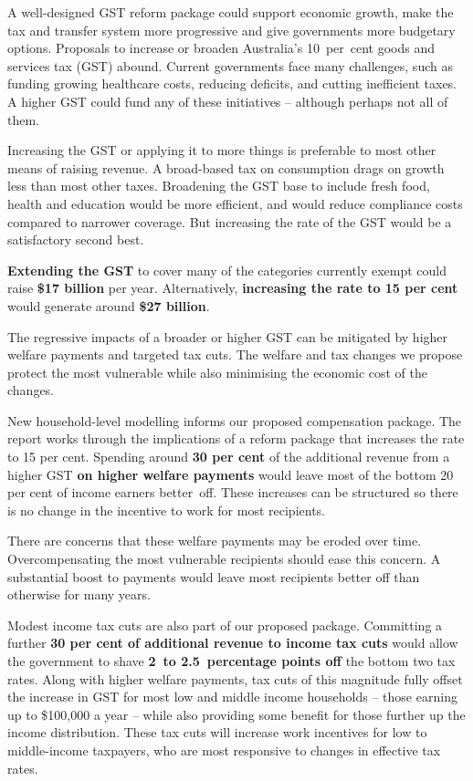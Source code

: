 

\setlength{\overviewextra}{2pt}
\addtolength{\columnsep}{\overviewextra}
\begin{overview}[-20pt]
A well-designed GST reform package could support economic growth, make the tax and transfer system more progressive and give governments more budgetary options.
Proposals to increase or broaden Australia’s 10~per~cent goods and services tax (GST) abound. Current governments face many challenges, such as funding growing healthcare costs, reducing deficits, and cutting inefficient taxes. A higher GST could fund any of these initiatives – although perhaps not all of them. 

Increasing the GST or applying it to more things is preferable to most other means of raising revenue. A broad-based tax on consumption drags on growth less than most other taxes. Broadening the GST base to include fresh food, health and education would be more efficient, and would reduce compliance costs compared to narrower coverage. But increasing the rate of the GST would be a satisfactory second best.  

\textbf{Extending the GST} to cover many of the categories currently exempt could raise \textbf{\$17 billion} per year. Alternatively, \textbf{increasing the rate to 15 per cent} would generate around \textbf{\$27 billion}. 

The regressive impacts of a broader or higher GST can be mitigated by higher welfare payments and targeted tax cuts. The welfare and tax changes we propose protect the most vulnerable while also minimising the economic cost of the changes. 

New household-level modelling informs our proposed compensation package. The report works through the implications of a reform package that increases the rate to 15 per cent. Spending around \textbf{30 per cent} of the additional revenue from a higher GST \textbf{on higher welfare payments} would leave most of the bottom 20 per cent of income earners better~off. These increases can be structured so there is no change in the incentive to work for most recipients. 

There are concerns that these welfare payments may be eroded over time. Overcompensating the most vulnerable recipients should ease this concern. A substantial boost to payments would leave most recipients better off than otherwise for many years.

Modest income tax cuts are also part of our proposed package. Committing a further \textbf{30 per cent of additional revenue to income tax cuts} would allow the government to shave \textbf{2~to 2.5~percentage points off} the bottom two tax rates. Along with higher welfare payments, tax cuts of this magnitude fully offset the increase in GST for most low and middle income households – those earning up to \$100,000 a year – while also providing some benefit for those further up the income distribution. These tax cuts will increase work incentives for low to middle-income taxpayers, who are most responsive to changes in effective tax rates. 


\end{overview}
